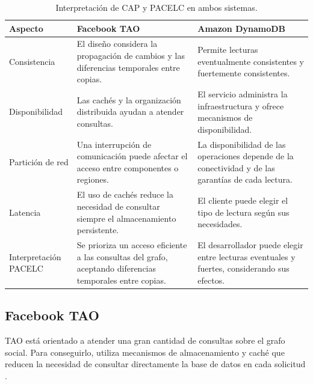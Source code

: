 \documentclass[12pt,a4paper]{article}
\begin{document}
\begin{table}[H]
\centering
\small
\caption{Interpretación de CAP y PACELC en ambos sistemas.}
\label{tab:cappacelc}
\begin{tabular}{p{2.7cm}p{5.5cm}p{5.5cm}}
\toprule
\textbf{Aspecto} &
\textbf{Facebook TAO} &
\textbf{Amazon DynamoDB} \\
\midrule

Consistencia &
El diseño considera la propagación de cambios y las diferencias temporales entre copias. &
Permite lecturas eventualmente consistentes y fuertemente consistentes. \\

\midrule

Disponibilidad &
Las cachés y la organización distribuida ayudan a atender consultas. &
El servicio administra la infraestructura y ofrece mecanismos de disponibilidad. \\

\midrule

Partición de red &
Una interrupción de comunicación puede afectar el acceso entre componentes o regiones. &
La disponibilidad de las operaciones depende de la conectividad y de las garantías de cada lectura. \\

\midrule

Latencia &
El uso de cachés reduce la necesidad de consultar siempre el almacenamiento persistente. &
El cliente puede elegir el tipo de lectura según sus necesidades. \\

\midrule

Interpretación PACELC &
Se prioriza un acceso eficiente a las consultas del grafo, aceptando diferencias temporales entre copias. &
El desarrollador puede elegir entre lecturas eventuales y fuertes, considerando sus efectos. \\

\bottomrule
\end{tabular}
\end{table}

\subsection{Facebook TAO}

TAO está orientado a atender una gran cantidad de consultas sobre el grafo social. Para conseguirlo, utiliza mecanismos de almacenamiento y caché que reducen la necesidad de consultar directamente la base de datos en cada solicitud \cite{bronson2013tao}.
\end{document}
